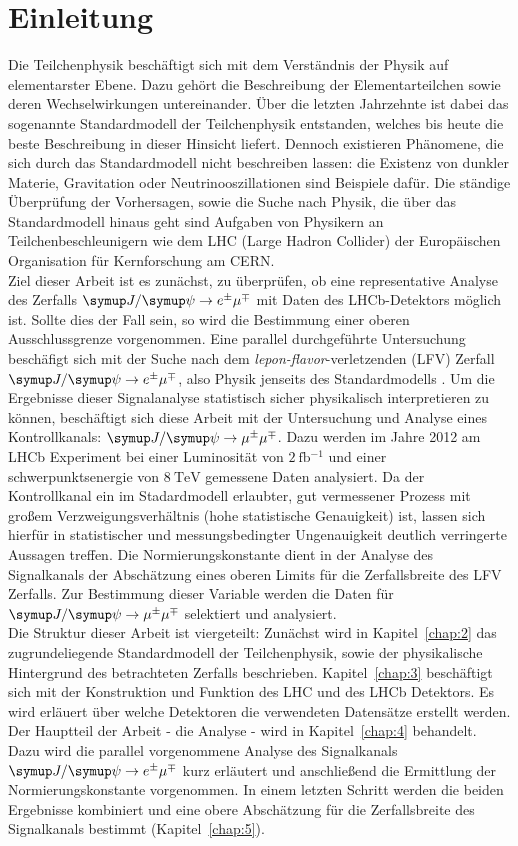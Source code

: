 \chapter{Einleitung}
%
Die Teilchenphysik beschäftigt sich mit dem Verständnis der Physik auf elementarster Ebene. Dazu gehört die Beschreibung der Elementarteilchen sowie deren Wechselwirkungen untereinander. Über die letzten Jahrzehnte ist dabei das sogenannte Standardmodell der Teilchenphysik entstanden, welches bis heute die beste Beschreibung in dieser Hinsicht liefert. Dennoch existieren Phänomene, die sich durch das Standardmodell nicht beschreiben lassen: die Existenz von dunkler Materie, Gravitation oder Neutrinooszillationen sind Beispiele dafür. Die ständige Überprüfung der Vorhersagen, sowie die Suche nach Physik, die über das Standardmodell hinaus geht sind Aufgaben von Physikern an Teilchenbeschleunigern wie dem LHC (Large Hadron Collider) der Europäischen Organisation für Kernforschung am CERN. \\
Ziel dieser Arbeit ist es zunächst, zu überprüfen, ob eine representative Analyse des Zerfalls $\signal$ mit Daten des LHCb-Detektors möglich ist. Sollte dies der Fall sein, so wird die Bestimmung einer oberen Ausschlussgrenze vorgenommen. Eine parallel durchgeführte Untersuchung beschäfigt sich mit der Suche nach dem \textit{lepon-flavor}-verletzenden (LFV) Zerfall $\signal$, also Physik jenseits des Standardmodells \cite{ba-maik}. Um die Ergebnisse dieser Signalanalyse statistisch sicher physikalisch interpretieren zu können, beschäftigt sich diese Arbeit mit der Untersuchung und Analyse eines Kontrollkanals: $\kontroll$.
Dazu werden im Jahre 2012 am LHCb Experiment bei einer Luminosität von $\SI{2}{\femto\barn^{-1}}$ und einer schwerpunktsenergie von $\SI{8}{\tera\electronvolt}$ gemessene Daten analysiert. Da der Kontrollkanal ein im Stadardmodell erlaubter, gut vermessener Prozess mit großem Verzweigungsverhältnis (hohe statistische Genauigkeit) ist, lassen sich hierfür in statistischer und messungsbedingter Ungenauigkeit deutlich verringerte Aussagen treffen. Die Normierungskonstante dient in der Analyse des Signalkanals der Abschätzung eines oberen Limits für die Zerfallsbreite des LFV Zerfalls. Zur Bestimmung dieser Variable werden die Daten für $\kontroll$ selektiert und analysiert.\\
Die Struktur dieser Arbeit ist viergeteilt: Zunächst wird in Kapitel~\ref{chap:2} das zugrundeliegende Standardmodell der Teilchenphysik, sowie der physikalische Hintergrund des betrachteten Zerfalls beschrieben. Kapitel~\ref{chap:3} beschäftigt sich mit der Konstruktion und Funktion des LHC und des LHCb Detektors. Es wird erläuert über welche Detektoren die verwendeten Datensätze erstellt werden. Der Hauptteil der Arbeit - die Analyse - wird in Kapitel~\ref{chap:4} behandelt. Dazu wird die parallel vorgenommene Analyse des Signalkanals $\signal$ kurz erläutert und anschließend die Ermittlung der Normierungskonstante vorgenommen. In einem letzten Schritt werden die beiden Ergebnisse kombiniert und eine obere Abschätzung für die Zerfallsbreite des Signalkanals bestimmt (Kapitel~\ref{chap:5}).
